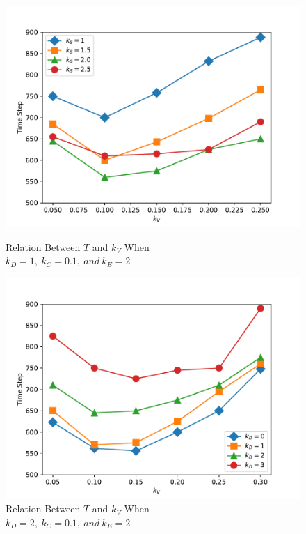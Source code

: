 \documentclass{mcmthesis}
\begin{document}
\begin{figure}[H]
	\parbox[b]{.5\textwidth}{
		\includegraphics[scale=0.5]{Time-kv-ks.pdf}
		\centering
		\captionsetup{font=small, labelfont=bf}
		\caption{Relation Between $T$ and $k_V$ When  \\$k_D=1,\ k_C=0.1,\ and\ k_E=2$}
		\label{v-s}
	}
	\parbox[b]{.5\textwidth}{
		\includegraphics[scale=0.5]{Time-kv-kd.pdf}
		\centering
		\captionsetup{font=small, labelfont=bf}
		\caption{Relation Between $T$ and $k_V$ When \\ $k_D=2,\ k_C=0.1,\ and\ k_E=2$}
		\label{v-d}
	}
\end{figure}
\end{document}
